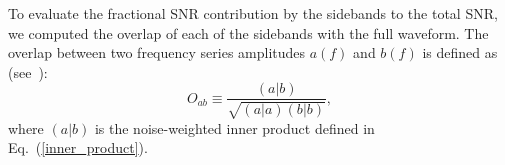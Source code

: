 To evaluate the fractional SNR contribution by the sidebands to the total SNR, 
we computed the overlap of each of the sidebands with the full waveform. 
The overlap between two frequency series amplitudes $a(f)$ and $b(f)$ is defined as (see~\cite{Lundgren2014}):
\begin{equation} 
O_{ab} \equiv \dfrac{(a|b)}{\sqrt{(a|a)(b|b)}},
\end{equation} 
where $(a|b)$ is the noise-weighted inner product defined in Eq.~(\ref{inner_product}).


